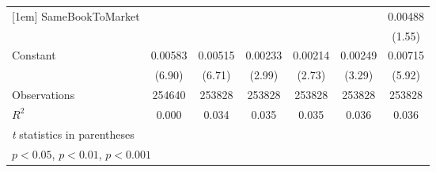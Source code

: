 {\begin{tabular}{l*{6}{c}}
[1em]
SameBookToMarket&                  &                  &                  &                  &                  &  0.00488         \\
                &                  &                  &                  &                  &                  &   (1.55)         \\
[1em]
Constant        &  0.00583\sym{***}&  0.00515\sym{***}&  0.00233\sym{**} &  0.00214\sym{**} &  0.00249\sym{**} &  0.00715\sym{***}\\
                &   (6.90)         &   (6.71)         &   (2.99)         &   (2.73)         &   (3.29)         &   (5.92)         \\
\hline
Observations    &   254640         &   253828         &   253828         &   253828         &   253828         &   253828         \\
\(R^{2}\)       &    0.000         &    0.034         &    0.035         &    0.035         &    0.036         &    0.036         \\
\hline\hline
\multicolumn{7}{l}{\footnotesize \textit{t} statistics in parentheses}\\
\multicolumn{7}{l}{\footnotesize \sym{*} \(p<0.05\), \sym{**} \(p<0.01\), \sym{***} \(p<0.001\)}\\
\end{tabular}
}
